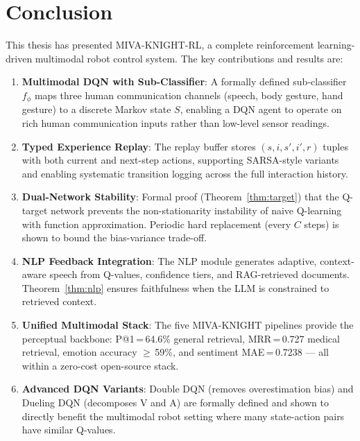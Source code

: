 \documentclass[12pt,a4paper]{article}
\theoremstyle{definition}
\theoremstyle{plain}
\theoremstyle{remark}
\begin{document}
\newpage
\section{Conclusion}

This thesis has presented MIVA-KNIGHT-RL, a complete reinforcement learning-driven multimodal robot control system. The key contributions and results are:

\begin{enumerate}
  \item \textbf{Multimodal DQN with Sub-Classifier}: A formally defined sub-classifier $f_\phi$ maps three human communication channels (speech, body gesture, hand gesture) to a discrete Markov state $S$, enabling a DQN agent to operate on rich human communication inputs rather than low-level sensor readings.

  \item \textbf{Typed Experience Replay}: The replay buffer stores $(s, i, s', i', r)$ tuples with both current and next-step actions, supporting SARSA-style variants and enabling systematic transition logging across the full interaction history.

  \item \textbf{Dual-Network Stability}: Formal proof (Theorem~\ref{thm:target}) that the Q-target network prevents the non-stationarity instability of naive Q-learning with function approximation. Periodic hard replacement (every $C$ steps) is shown to bound the bias-variance trade-off.

  \item \textbf{NLP Feedback Integration}: The NLP module generates adaptive, context-aware speech from Q-values, confidence tiers, and RAG-retrieved documents. Theorem~\ref{thm:nlp} ensures faithfulness when the LLM is constrained to retrieved context.

  \item \textbf{Unified Multimodal Stack}: The five MIVA-KNIGHT pipelines provide the perceptual backbone: P@1\,=\,64.6\% general retrieval, MRR\,=\,0.727 medical retrieval, emotion accuracy $\geq$\,59\%, and sentiment MAE\,=\,0.7238 — all within a zero-cost open-source stack.

  \item \textbf{Advanced DQN Variants}: Double DQN (removes overestimation bias) and Dueling DQN (decomposes V and A) are formally defined and shown to directly benefit the multimodal robot setting where many state-action pairs have similar Q-values.
\end{enumerate}
\end{document}
